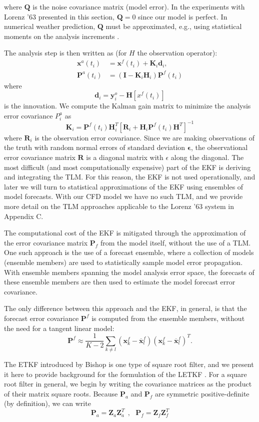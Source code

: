 \documentclass[pre,twocolumn,twoside,byrevtex,superscriptaddress]{revtex4}
\newcommand{\mbe}{\mathbf{\epsilon}}
\newcommand{\mbx}{\mathbf{x}}
\newcommand{\mby}{\mathbf{y}}
\newcommand{\mbd}{\mathbf{d}}
\newcommand{\mbR}{\mathbf{R}}
\newcommand{\mbH}{\mathbf{H}}
\newcommand{\mbK}{\mathbf{K}}
\newcommand{\mbP}{\mathbf{P}}
\newcommand{\mbZ}{\mathbf{Z}}
\begin{document}
where $\mathbf{Q}$ is the noise covariance matrix (model error).
In the experiments with Lorenz '63 presented in this section, $\mathbf{Q} = 0$ since our model is perfect.
In numerical weather prediction, $\mathbf{Q}$ must be approximated, e.g., using statistical moments on the analysis increments \cite{danforth2007estimating,li2009accounting,danforth2008using}.

The analysis step is then written as (for $H$ the observation operator):
\begin{align} \mbx^a (t_i ) &= \mbx^f (t_i) + \mbK_i \mbd_i,\\
\mbP^a (t_i) &= (\mathbf{I} - \mbK_i \mbH_i )\mbP^f (t_i) \end{align}
where
\[ \mbd_i = \mby_i^o - \mbH[x^f (t_i) ] \]
is the innovation. We compute the Kalman gain matrix to minimize the analysis error covariance $P^a _i$ as
\[ \mbK_i = \mbP^f (t_i) \mbH_i ^T [ \mbR_i + \mbH_i \mbP^f (t_i) \mbH^T ] ^{-1} \]
where $\mbR_i$ is the observation error covariance.
Since we are making observations of the truth with random normal errors of standard deviation $\mbe$, the observational error covariance matrix $\mbR$ is a diagonal matrix with $\epsilon$ along the diagonal.
The most difficult (and most computationally expensive) part of the EKF is deriving and integrating the TLM.
For this reason, the EKF is not used operationally, and later we will turn to statistical approximations of the EKF using ensembles of model forecasts.
With our CFD model we have no such TLM, and we provide more detail on the TLM approaches applicable to the Lorenz '63 system in Appendix C.

The computational cost of the EKF is mitigated through the approximation of the error covariance matrix $\mbP_f$ from the model itself, without the use of a TLM.
One such approach is the use of a forecast ensemble, where a collection of models (ensemble members) are used to statistically sample model error propagation.
With ensemble members spanning the model analysis error space, the forecasts of these ensemble members are then used to estimate the model forecast error covariance.

The only difference between this approach and the EKF, in general, is that the forecast error covariance $\mbP^f$ is computed from the ensemble members, without the need for a tangent linear model:
\[ \mbP^f \approx \frac{1}{K-2} \sum _{k\neq l} \left ( \mbx_k ^f - \overline{\mbx} ^f _l \right ) \left (\mbx_k ^f - \overline{\mbx} ^f _l \right ) ^T .\]

The ETKF introduced by Bishop is one type of square root filter, and we present it here to provide background for the formulation of the LETKF \cite{bishop2001adaptive}.
For a square root filter in general, we begin by writing the covariance matrices as the product of their matrix square roots.
Because $\mbP_a$ and $\mbP_f$ are symmetric positive-definite (by definition), we can write
\begin{equation} \mbP_a = \mbZ_a \mbZ_a^T ~~,~~~ \mbP_f = \mbZ_f \mbZ_f^T \end{equation}
\end{document}

